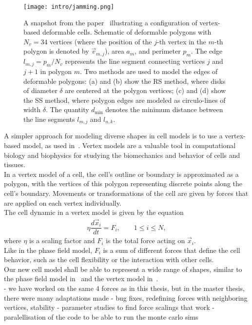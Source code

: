 
\begin{figure}[h!]
	\centering
	\texttt{[image: intro/jamming.png]}
	\caption{A snapshot from the paper~\cite{Boromand2018} illustrating a configuration of vertex-based deformable cells. Schematic of deformable polygons with $N_v = 34$ vertices (where the position of the $j$-th vertex in the $m$-th polygon is denoted by $\vec{v}_{m,j}$), area $a_m$, and perimeter $p_m$. The edge $l_{m,j} = p_m / N_v$ represents the line segment connecting vertices $j$ and $j+1$ in polygon $m$. Two methods are used to model the edges of deformable polygons: (a) and (b) show the RS method, where disks of diameter $\delta$ are centered at the polygon vertices; (c) and (d) show the SS method, where polygon edges are modeled as circulo-lines of width $\delta$. The quantity $d_{\text{min}}$ denotes the minimum distance between the line segments $l_{m,j}$ and $l_{n,k}$.
	}
	\label{fig:vertex}
\end{figure}


A simpler approach for modeling diverse shapes in cell models is to use a vertex-based model, as used in~\cite{Fletcher14}. 
Vertex models are a valuable tool in computational biology and biophysics for studying the biomechanics and behavior of cells and tissues. \\
In a vertex model of a cell, the cell's outline or boundary is approximated as a polygon, with the vertices of this polygon representing discrete points along the cell's boundary. 
Movements or transformations of the cell are given by forces that are applied on each vertex individually. \\
The cell dynamic in a vertex model is given by the equation
\begin{align}
	\eta \dfrac{d \vec{x}_i}{dt} = F_i, \qquad 1 \leq i \leq N \label{eq:vertexmodel}, 
\end{align}
where $\eta$ is a scaling factor and $F_i$ is the total force acting on $\vec{x}_i$. \\
Like in the phase field model, $F_i$ is a sum of different forces that define the cell behavior, such as the cell flexibility or the interaction with other cells. \\
Our new cell model shall be able to represent a wide range of shapes, similar to the phase field model in~\cite{Happel2023} and the vertex model in~\cite{Fletcher14}. \\
- we have worked on the same 4 forces as in this thesis, but in the master thesis, there were many adaptations made 
- bug fixes, redefining forces with neighboring vertices, stability 
- parameter studies to find force scalings that work
- paralellisation of the code to be able to run the monte carlo sims  


